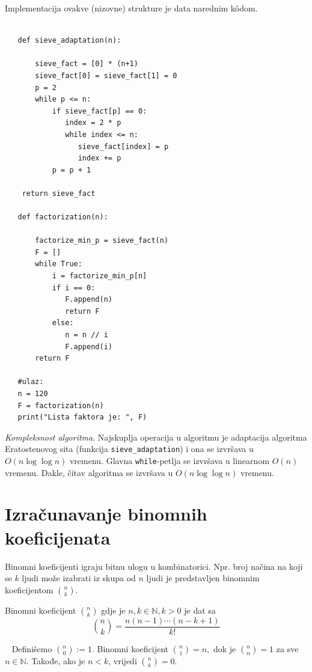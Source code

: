  Implementacija ovakve (nizovne) strukture je data narednim k\^odom. 
 
 \begin{verbatim}
 
   def sieve_adaptation(n):
   
       sieve_fact = [0] * (n+1)
       sieve_fact[0] = sieve_fact[1] = 0
       p = 2
       while p <= n:
           if sieve_fact[p] == 0:
       		  index = 2 * p
       		  while index <= n:
       			 sieve_fact[index] = p
       			 index += p
           p = p + 1
 	
	return sieve_fact
 	
   def factorization(n):
       
       factorize_min_p = sieve_fact(n)
       F = []
       while True: 
           i = factorize_min_p[n]
           if i == 0: 
              F.append(n)
              return F
           else:
              n = n // i
              F.append(i)
       return F  
   
   #ulaz: 
   n = 120
   F = factorization(n)
   print("Lista faktora je: ", F)
 \end{verbatim} 
 
\textit{Kompleksnost algoritma}. Najskuplja operacija u algoritmu je adaptacija algoritma Eratostenovog sita (funkcija \texttt{sieve\_adaptation}) i ona se izvršava u $O(n \log \log n)$ vremenu. Glavna \texttt{while}-petlja se izvršava u linearnom $O(n)$ vremenu. Dakle, čitav algoritma se izvršava u 
 $O(n \log \log n)$ vremenu.
 
  \section{Izračunavanje binomnih koeficijenata} 
  
  Binomni koeficijenti igraju bitnu ulogu u kombinatorici. Npr. broj načina na koji se $k$ ljudi može izabrati iz skupa od $n$ ljudi je predstavljen binomnim koeficijentom $\binom{n}{k}$. 
  
  \begin{definition}
  	 Binomni koeficijent $\binom{n}{k}$ gdje je $n, k \in \mathbb{N}, k > 0$  je dat sa 
  	 $$\binom{n}{k} = \frac{n(n-1) \cdots (n-k+1)}{k!}$$
  \end{definition}
  
~ Definišemo $\binom{n}{0} := 1$. Binomni koeficijent $\binom{n}{1} = n,$ dok je $\binom{n}{n} = 1$ za sve $n \in \mathbb{N}.$ Takođe, ako je $n <k$, vrijedi $\binom{n}{k}=0$.
 
